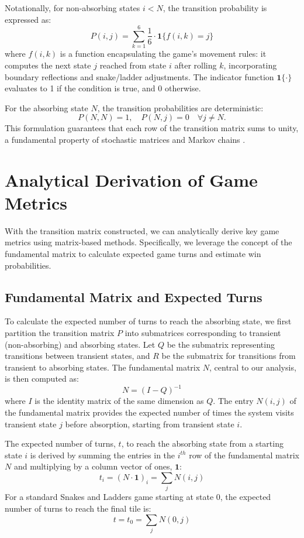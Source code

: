 Notationally, for non-absorbing states $i < N$, the transition probability is expressed as:
\[
P(i, j) = \sum_{k=1}^{6} \frac{1}{6} \cdot \mathbf{1}\{f(i,k) = j \}
\]
where $f(i,k)$ is a function encapsulating the game's movement rules: it computes the next state $j$ reached from state $i$ after rolling $k$, incorporating boundary reflections and snake/ladder adjustments. The indicator function $\mathbf{1}\{\cdot\}$ evaluates to 1 if the condition is true, and 0 otherwise.

For the absorbing state $N$, the transition probabilities are deterministic:
\[
P(N, N) = 1, \quad P(N, j) = 0 \quad \forall j \neq N.
\]
This formulation guarantees that each row of the transition matrix sums to unity, a fundamental property of stochastic matrices and Markov chains \autocite{dusautoyWorldEightyGames2024}.

\section{Analytical Derivation of Game Metrics}

With the transition matrix constructed, we can analytically derive key game metrics using matrix-based methods. Specifically, we leverage the concept of the fundamental matrix to calculate expected game turns and estimate win probabilities.

\subsection{Fundamental Matrix and Expected Turns}

To calculate the expected number of turns to reach the absorbing state, we first partition the transition matrix $P$ into submatrices corresponding to transient (non-absorbing) and absorbing states. Let $Q$ be the submatrix representing transitions between transient states, and $R$ be the submatrix for transitions from transient to absorbing states. The fundamental matrix $N$, central to our analysis, is then computed as:
\[
N = (I - Q)^{-1}
\]
where $I$ is the identity matrix of the same dimension as $Q$. The entry $N(i, j)$ of the fundamental matrix provides the expected number of times the system visits transient state $j$ before absorption, starting from transient state $i$.

The expected number of turns, $t$, to reach the absorbing state from a starting state $i$ is derived by summing the entries in the $i^{th}$ row of the fundamental matrix $N$ and multiplying by a column vector of ones, $\mathbf{1}$:
\[
t_i = (N \cdot \mathbf{1})_i = \sum_{j} N(i, j)
\]
For a standard Snakes and Ladders game starting at state 0, the expected number of turns to reach the final tile is:
\[
t = t_0 = \sum_{j} N(0, j)
\]

